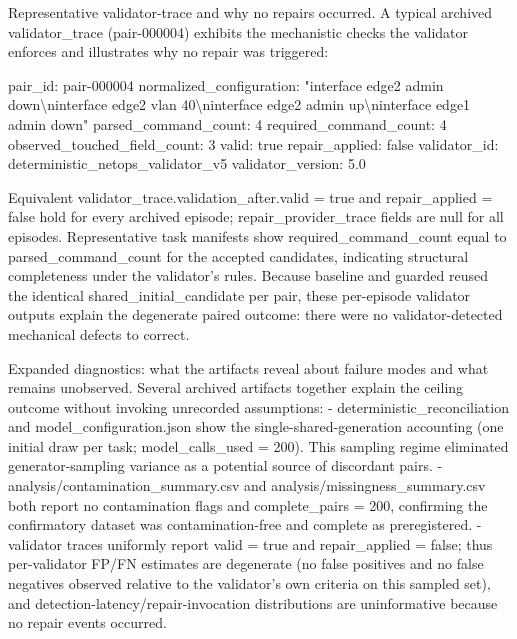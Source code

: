 \documentclass[conference]{IEEEtran}
\begin{document}
Representative validator-trace and why no repairs occurred. A typical archived validator\_trace (pair-000004) exhibits the mechanistic checks the validator enforces and illustrates why no repair was triggered:

pair\_id: pair-000004
  normalized\_configuration: "interface edge2 admin down\textbackslash{}ninterface edge2 vlan 40\textbackslash{}ninterface edge2 admin up\textbackslash{}ninterface edge1 admin down"
  parsed\_command\_count: 4
  required\_command\_count: 4
  observed\_touched\_field\_count: 3
  valid: true
  repair\_applied: false
  validator\_id: deterministic\_netops\_validator\_v5
  validator\_version: 5.0

Equivalent validator\_trace.validation\_after.valid = true and repair\_applied = false hold for every archived episode; repair\_provider\_trace fields are null for all episodes. Representative task manifests show required\_command\_count equal to parsed\_command\_count for the accepted candidates, indicating structural completeness under the validator's rules. Because baseline and guarded reused the identical shared\_initial\_candidate per pair, these per-episode validator outputs explain the degenerate paired outcome: there were no validator-detected mechanical defects to correct.

Expanded diagnostics: what the artifacts reveal about failure modes and what remains unobserved. Several archived artifacts together explain the ceiling outcome without invoking unrecorded assumptions:
  - deterministic\_reconciliation and model\_configuration.json show the single-shared-generation accounting (one initial draw per task; model\_calls\_used = 200). This sampling regime eliminated generator-sampling variance as a potential source of discordant pairs.
  - analysis/contamination\_summary.csv and analysis/missingness\_summary.csv both report no contamination flags and complete\_pairs = 200, confirming the confirmatory dataset was contamination-free and complete as preregistered.
  - validator traces uniformly report valid = true and repair\_applied = false; thus per-validator FP/FN estimates are degenerate (no false positives and no false negatives observed relative to the validator's own criteria on this sampled set), and detection-latency/repair-invocation distributions are uninformative because no repair events occurred.
\end{document}
